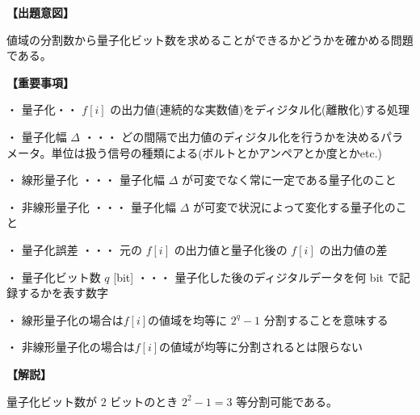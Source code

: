 \noindent \textbf{【出題意図】}

\noindent 値域の分割数から量子化ビット数を求めることができるかどうかを確かめる問題である。

\vspace{1em}
\noindent \textbf{【重要事項】}

\medskip
\noindent ・ 量子化・・ $f[i]$ の出力値(連続的な実数値)をディジタル化(離散化)する処理

\medskip
\noindent ・ 量子化幅 $\Delta$ ・・・ どの間隔で出力値のディジタル化を行うかを決めるパラメータ。単位は扱う信号の種類による(ボルトとかアンペアとか度とかetc.)

\medskip
\noindent ・ 線形量子化 ・・・ 量子化幅  $\Delta$ が可変でなく常に一定である量子化のこと

\medskip
\noindent ・ 非線形量子化 ・・・ 量子化幅  $\Delta$ が可変で状況によって変化する量子化のこと

\medskip
\noindent ・ 量子化誤差 ・・・ 元の $f[i]$ の出力値と量子化後の $f[i]$ の出力値の差

\medskip
\noindent ・ 量子化ビット数 $q$ [bit] ・・・ 量子化した後のディジタルデータを何 bit で記録するかを表す数字

\medskip
\noindent ・ 線形量子化の場合は$f[i]$の値域を均等に $2^q-1$ 分割することを意味する

\medskip
\noindent ・ 非線形量子化の場合は$f[i]$の値域が均等に分割されるとは限らない

\vspace{1em}
\noindent \textbf{【解説】}

\noindent 量子化ビット数が $2$ ビットのとき $2^2-1 = 3$ 等分割可能である。
